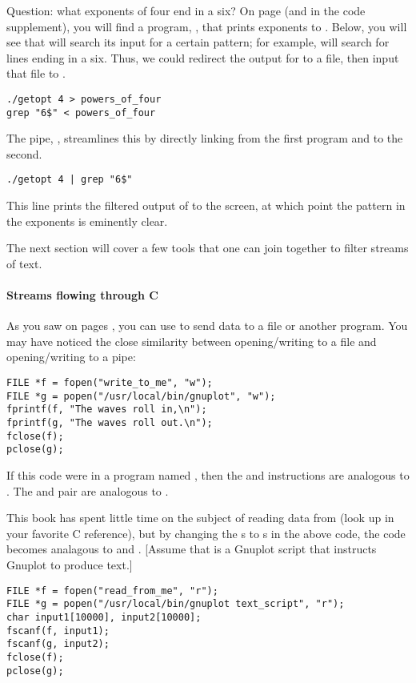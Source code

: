 Question: what exponents of four end in a six?  On page \pageref{getopt}
(and in the code supplement), you will find a program, , that prints
exponents to . Below, you will see that  will search
its input for a certain pattern; for example,  will
search  for lines ending in a six. Thus, we could redirect the
output for  to a file, then input that file to .
\begin{lstlisting}
./getopt 4 > powers_of_four
grep "6$" < powers_of_four
\end{lstlisting}
The pipe, \ci{|}, streamlines this by directly linking  from
the first program and  to the second.
\begin{lstlisting}
./getopt 4 | grep "6$" 
\end{lstlisting}
This line prints the filtered output of  to the screen, at
which point the pattern in the exponents is eminently clear.

The next section will cover a few tools that one can join together to
filter streams of text.

\paragraph{Streams flowing through C}

As you saw on pages \pageref{fprintf}{\it ff}, you can use 
to send data to a file or another program. You may have noticed the
close similarity between opening/writing to a file and opening/writing
to a pipe:  
\begin{lstlisting}
FILE *f = fopen("write_to_me", "w");
FILE *g = popen("/usr/local/bin/gnuplot", "w");
fprintf(f, "The waves roll in,\n");
fprintf(g, "The waves roll out.\n");
fclose(f);
pclose(g);
\end{lstlisting}
If this code were in a program named , then the 
and  instructions are analogous to 
. The  and  pair are
analogous to .

This book has spent little time on the subject of reading data from
 (look up  in your favorite C reference), but by
changing the s to s in the above code, the code becomes
analagous to
 and .
[Assume that  is a Gnuplot script that instructs
Gnuplot to produce text.]
\begin{lstlisting}
FILE *f = fopen("read_from_me", "r");
FILE *g = popen("/usr/local/bin/gnuplot text_script", "r");
char input1[10000], input2[10000];
fscanf(f, input1);
fscanf(g, input2);
fclose(f);
pclose(g);
\end{lstlisting}

